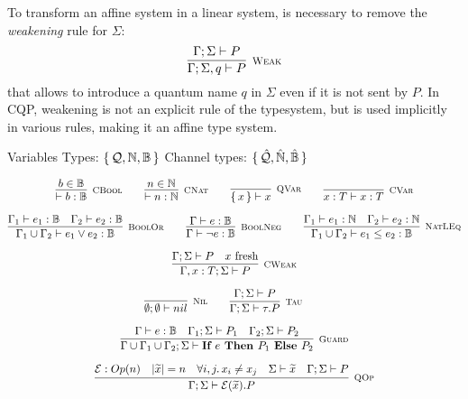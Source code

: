To transform an affine system in a linear system, is necessary to remove the \textit{weakening} rule for $\Sigma$:
\[ \infer[\mbox{\footnotesize\scshape Weak}]{\Gamma; \Sigma,q \vdash P}{\Gamma; \Sigma \vdash P}
\]
that allows to introduce a quantum name $q$ in $\Sigma$ even if it is not sent by $P$. In CQP, weakening is not an explicit rule of the typesystem, but is used implicitly in various rules, making it an affine type system.



Variables Types: $\set{\mathcal{Q}, \mathbb{N}, \mathbb{B}}$
Channel types: $\set{\hat{\mathcal{Q}}, \hat{\mathbb{N}}, \hat{\mathbb{B}}}$

\begin{gather*}
\infer[\mbox{\footnotesize\scshape CBool}]{\vdash b : \mathbb{B}}{b \in \mathbb{B}} \qquad
\infer[\mbox{\footnotesize\scshape CNat}]{\vdash n : \mathbb{N}}{n \in \mathbb{N}} \qquad
\infer[\mbox{\footnotesize\scshape QVar}]{\set{x} \vdash x}{} \qquad
\infer[\mbox{\footnotesize\scshape CVar}]{x : T \vdash x : T}{} \\[0.2cm]
\infer[\mbox{\footnotesize\scshape BoolOr}]{\Gamma_1 \cup \Gamma_2 \vdash e_1 \lor e_2 : \mathbb{B}}{\Gamma_1 \vdash e_1 : \mathbb{B} & \Gamma_2 \vdash e_2 : \mathbb{B}} \qquad
\infer[\mbox{\footnotesize\scshape BoolNeg}]{\Gamma \vdash \neg e : \mathbb{B}}{\Gamma \vdash e : \mathbb{B}} \qquad
\infer[\mbox{\footnotesize\scshape NatLEq}]{\Gamma_1 \cup \Gamma_2 \vdash e_1 \leq e_2 : \mathbb{B}}{\Gamma_1 \vdash e_1 : \mathbb{N} & \Gamma_2 \vdash e_2 : \mathbb{N}} \\[0.2cm]
 \infer[\mbox{\footnotesize\scshape CWeak}]{\Gamma, x : T; \Sigma \vdash P}{\Gamma; \Sigma \vdash P & \text{$x$ fresh}} \\[0.2cm]
\infer[\mbox{\footnotesize\scshape Nil}]{\emptyset; \emptyset \vdash nil}{} \qquad
\infer[\mbox{\footnotesize\scshape Tau}]{\Gamma; \Sigma \vdash \tau . P}{ \Gamma; \Sigma \vdash P} \qquad
\\[0.2cm]
\infer[\mbox{\footnotesize\scshape Guard}]{\Gamma \cup \Gamma_1 \cup \Gamma_2; \Sigma \vdash \ITE{e}{P_1}{P_2}}{\Gamma \vdash e : \mathbb{B} & \Gamma_1; \Sigma \vdash P_1 & \Gamma_2; \Sigma \vdash P_2} \\[0.2cm]
\infer[\mbox{\footnotesize\scshape QOp}]
{\Gamma; \Sigma \vdash \mathcal{E}(\widetilde{x}) . P}
{\mathcal{E}: Op(n) & |\widetilde{x}| = n & \forall i, j \ldotp x_i \neq x_j & \Sigma \vdash \widetilde{x} & \Gamma; \Sigma \vdash P} \\[0.2cm]

\end{gather*}
